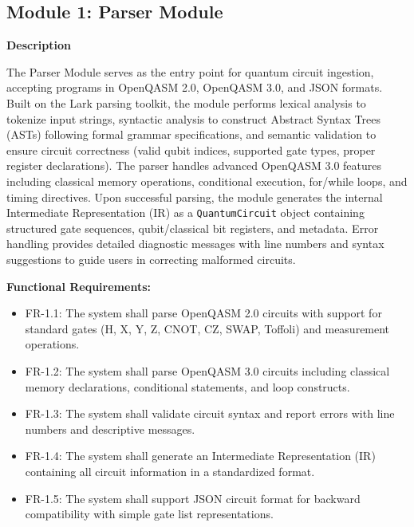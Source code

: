
\subsection{Module 1: Parser Module}

\textbf{Description}

The Parser Module serves as the entry point for quantum circuit ingestion, accepting programs in OpenQASM 2.0, OpenQASM 3.0, and JSON formats. Built on the Lark parsing toolkit, the module performs lexical analysis to tokenize input strings, syntactic analysis to construct Abstract Syntax Trees (ASTs) following formal grammar specifications, and semantic validation to ensure circuit correctness (valid qubit indices, supported gate types, proper register declarations). The parser handles advanced OpenQASM 3.0 features including classical memory operations, conditional execution, for/while loops, and timing directives. Upon successful parsing, the module generates the internal Intermediate Representation (IR) as a \texttt{QuantumCircuit} object containing structured gate sequences, qubit/classical bit registers, and metadata. Error handling provides detailed diagnostic messages with line numbers and syntax suggestions to guide users in correcting malformed circuits.

\textbf{Functional Requirements:}

\begin{itemize}
    \item FR-1.1: The system shall parse OpenQASM 2.0 circuits with support for standard gates (H, X, Y, Z, CNOT, CZ, SWAP, Toffoli) and measurement operations.
    \item FR-1.2: The system shall parse OpenQASM 3.0 circuits including classical memory declarations, conditional statements, and loop constructs.
    \item FR-1.3: The system shall validate circuit syntax and report errors with line numbers and descriptive messages.
    \item FR-1.4: The system shall generate an Intermediate Representation (IR) containing all circuit information in a standardized format.
    \item FR-1.5: The system shall support JSON circuit format for backward compatibility with simple gate list representations.
\end{itemize}



